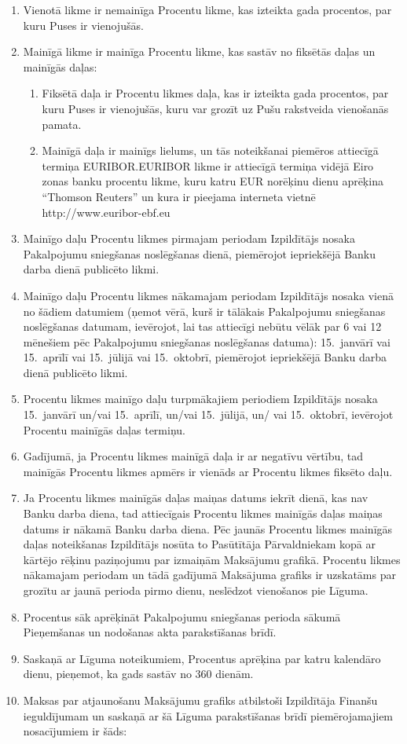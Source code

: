 \begin{enumerate}[label=\arabic*.]
	\item Vienotā likme ir nemainīga Procentu likme, kas izteikta gada procentos, par kuru Puses ir vienojušās.
	\item Mainīgā likme ir mainīga Procentu likme, kas sastāv no fiksētās daļas un mainīgās daļas:
	\begin{enumerate}
		\item Fiksētā daļa ir Procentu likmes daļa, kas ir izteikta gada procentos, par kuru Puses ir vienojušās, kuru var grozīt uz Pušu rakstveida vienošanās pamata.
		\item Mainīgā daļa ir mainīgs lielums, un tās noteikšanai piemēros attiecīgā termiņa EURIBOR.\@ EURIBOR likme ir attiecīgā termiņa vidējā Eiro zonas banku procentu likme, kuru katru EUR norēķinu dienu aprēķina ``Thomson Reuters'' un kura ir pieejama interneta vietnē http://www.euribor-ebf.eu
	\end{enumerate}
	\item Mainīgo daļu Procentu likmes pirmajam periodam Izpildītājs nosaka Pakalpojumu sniegšanas noslēgšanas dienā, piemērojot iepriekšējā Banku darba dienā publicēto likmi.
	\item Mainīgo daļu Procentu likmes nākamajam periodam Izpildītājs nosaka vienā no šādiem datumiem (ņemot vērā, kurš ir tālākais Pakalpojumu sniegšanas noslēgšanas datumam, ievērojot, lai tas attiecīgi nebūtu vēlāk par 6 vai 12 mēnešiem pēc Pakalpojumu sniegšanas noslēgšanas datuma): 15. janvārī vai 15. aprīlī vai 15. jūlijā vai 15. oktobrī, piemērojot iepriekšējā Banku darba dienā publicēto likmi.
	\item Procentu likmes mainīgo daļu turpmākajiem periodiem Izpildītājs nosaka 15.\ janvārī un/vai 15.\ aprīlī, un/vai 15.\ jūlijā, un/ vai 15.\ oktobrī, ievērojot Procentu mainīgās daļas termiņu.
	\item Gadījumā, ja Procentu likmes mainīgā daļa ir ar negatīvu vērtību, tad mainīgās Procentu likmes apmērs ir vienāds ar Procentu likmes fiksēto daļu.
	\item Ja Procentu likmes mainīgās daļas maiņas datums iekrīt dienā, kas nav Banku darba diena, tad attiecīgais Procentu likmes mainīgās daļas maiņas datums ir nākamā Banku darba diena. Pēc jaunās Procentu likmes mainīgās daļas noteikšanas Izpildītājs nosūta to Pasūtītāja Pārvaldniekam kopā ar kārtējo rēķinu paziņojumu par izmaiņām Maksājumu grafikā. Procentu likmes nākamajam periodam un tādā gadījumā Maksājuma grafiks ir uzskatāms par grozītu ar jaunā perioda pirmo dienu, neslēdzot vienošanos pie Līguma.
	\item Procentus sāk aprēķināt Pakalpojumu sniegšanas perioda sākumā Pieņemšanas un nodošanas akta parakstīšanas brīdī.
	\item Saskaņā ar Līguma noteikumiem, Procentus aprēķina par katru kalendāro dienu, pieņemot, ka gads sastāv no 360 dienām.
	\item Maksas par atjaunošanu Maksājumu grafiks atbilstoši Izpildītāja Finanšu ieguldījumam un saskaņā ar šā Līguma parakstīšanas brīdī piemērojamajiem nosacījumiem ir šāds:


\end{enumerate}
